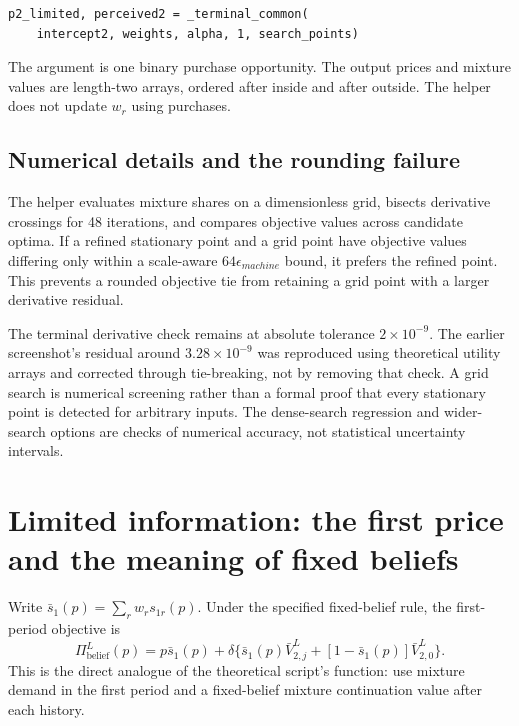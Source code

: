 \documentclass[11pt]{article}
\newcommand{\code}[1]{\texttt{\detokenize{#1}}}
\begin{document}
\begin{lstlisting}
p2_limited, perceived2 = _terminal_common(
    intercept2, weights, alpha, 1, search_points)
\end{lstlisting}
The argument \code{1} is one binary purchase opportunity. The output prices and mixture values are length-two arrays, ordered after inside and after outside. The helper does not update $w_r$ using purchases.

\subsection{Numerical details and the rounding failure}
The helper evaluates mixture shares on a dimensionless grid, bisects derivative crossings for 48 iterations, and compares objective values across candidate optima. If a refined stationary point and a grid point have objective values differing only within a scale-aware $64\epsilon_{machine}$ bound, it prefers the refined point. This prevents a rounded objective tie from retaining a grid point with a larger derivative residual.

The terminal derivative check remains at absolute tolerance $2\times10^{-9}$. The earlier screenshot's residual around $3.28\times10^{-9}$ was reproduced using theoretical utility arrays and corrected through tie-breaking, not by removing that check. A grid search is numerical screening rather than a formal proof that every stationary point is detected for arbitrary inputs. The dense-search regression and wider-search options are checks of numerical accuracy, not statistical uncertainty intervals.

\section{Limited information: the first price and the meaning of fixed beliefs}
Write $\bar s_1(p)=\sum_rw_r s_{1r}(p)$. Under the specified fixed-belief rule, the first-period objective is
\begin{equation}\label{eq:subjective}
 \Pi^L_{\mathrm{belief}}(p)=p\bar s_1(p)+\delta\{\bar s_1(p)\bar V^L_{2,j}
                    +[1-\bar s_1(p)]\bar V^L_{2,0}\}.
\end{equation}
This is the direct analogue of the theoretical script's \code{evaluate} function: use mixture demand in the first period and a fixed-belief mixture continuation value after each history.
\end{document}

